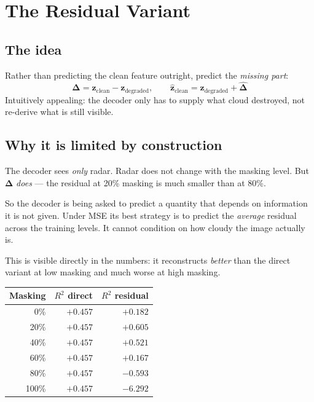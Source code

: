 \documentclass[11pt,a4paper]{report}
\newcommand{\zc}{\mathbf{z}_{\text{clean}}}
\newcommand{\zd}{\mathbf{z}_{\text{degraded}}}
\newcommand{\zh}{\hat{\mathbf{z}}_{\text{clean}}}
\begin{document}
\chapter{The Residual Variant}
\label{ch:res}

\section{The idea}

Rather than predicting the clean feature outright, predict the \emph{missing
part}:
\[
\boldsymbol\Delta = \zc - \zd, \qquad
\zh = \zd + \hat{\boldsymbol\Delta}
\]
Intuitively appealing: the decoder only has to supply what cloud destroyed, not
re-derive what is still visible.

\section{Why it is limited by construction}

\begin{flagbox}
The decoder sees \emph{only} radar. Radar does not change with the masking
level. But $\boldsymbol\Delta$ \emph{does} --- the residual at 20\% masking is
much smaller than at 80\%.

\medskip
So the decoder is being asked to predict a quantity that depends on information
it is not given. Under MSE its best strategy is to predict the \emph{average}
residual across the training levels. It cannot condition on how cloudy the image
actually is.
\end{flagbox}

This is visible directly in the numbers: it reconstructs \emph{better} than the
direct variant at low masking and much worse at high masking.

\begin{center}
\small
\begin{tabular}{@{}rrr@{}}
\toprule
\textbf{Masking} & $R^2$ \textbf{direct} & $R^2$ \textbf{residual} \\
\midrule
0\%   & $+0.457$ & $+0.182$ \\
20\%  & $+0.457$ & $\mathbf{+0.605}$ \\
40\%  & $+0.457$ & $+0.521$ \\
60\%  & $+0.457$ & $+0.167$ \\
80\%  & $+0.457$ & $-0.593$ \\
100\% & $+0.457$ & $-6.292$ \\
\bottomrule
\end{tabular}
\end{center}
\end{document}
